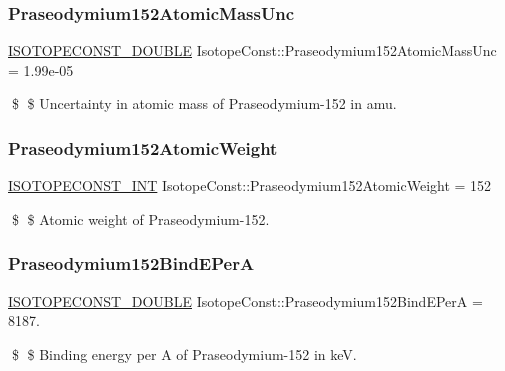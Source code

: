 \subsubsection{\texorpdfstring{Praseodymium152\+Atomic\+Mass\+Unc}{Praseodymium152AtomicMassUnc}}
{\footnotesize\ttfamily \mbox{\hyperlink{group___isotope_const-_macros_ga8f45a7272ce02c0b4c65c44636ed719a}{I\+S\+O\+T\+O\+P\+E\+C\+O\+N\+S\+T\+\_\+\+D\+O\+U\+B\+LE}} Isotope\+Const\+::\+Praseodymium152\+Atomic\+Mass\+Unc = 1.\+99e-\/05}

\$ \$ Uncertainty in atomic mass of Praseodymium-\/152 in amu. \mbox{\label{group___isotope_const-_praseodymium-_pr152_gacf8d2d526d2e41c6aca81bfef99124e8}} 
\subsubsection{\texorpdfstring{Praseodymium152\+Atomic\+Weight}{Praseodymium152AtomicWeight}}
{\footnotesize\ttfamily \mbox{\hyperlink{group___isotope_const-_macros_ga5f18360b3e99483a35c32d789e62621c}{I\+S\+O\+T\+O\+P\+E\+C\+O\+N\+S\+T\+\_\+\+I\+NT}} Isotope\+Const\+::\+Praseodymium152\+Atomic\+Weight = 152}

\$ \$ Atomic weight of Praseodymium-\/152. \mbox{\label{group___isotope_const-_praseodymium-_pr152_ga9d095ee5a9f0cef836fb4c4c0d6c187b}} 
\subsubsection{\texorpdfstring{Praseodymium152\+Bind\+E\+PerA}{Praseodymium152BindEPerA}}
{\footnotesize\ttfamily \mbox{\hyperlink{group___isotope_const-_macros_ga8f45a7272ce02c0b4c65c44636ed719a}{I\+S\+O\+T\+O\+P\+E\+C\+O\+N\+S\+T\+\_\+\+D\+O\+U\+B\+LE}} Isotope\+Const\+::\+Praseodymium152\+Bind\+E\+PerA = 8187.}

\$ \$ Binding energy per A of Praseodymium-\/152 in keV. \mbox{\label{group___isotope_const-_praseodymium-_pr152_gae6bd66795ebf80995b20e0d33966ad37}} 
